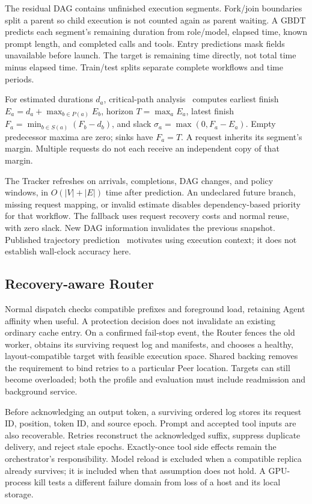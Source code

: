 The residual DAG contains unfinished execution segments. Fork/join
boundaries split a parent so child execution is not counted again as
parent waiting. A GBDT predicts each segment's remaining duration from
role/model, elapsed time, known prompt length, and completed calls and
tools. Entry predictions mask fields unavailable before launch.
The target is remaining time directly, not total time minus elapsed time.
Train/test splits separate complete workflows and time periods.

For estimated durations $d_a$, critical-path analysis~\cite{kelley1959cpm}
computes earliest finish $E_a=d_a+\max_{b\in P(a)}E_b$, horizon
$T=\max_a E_a$, latest finish $F_a=\min_{b\in S(a)}(F_b-d_b)$, and
slack $\sigma_a=\max(0,F_a-E_a)$. Empty predecessor maxima are zero;
sinks have $F_a=T$. A request inherits its segment's margin. Multiple
requests do not each receive an independent copy of that margin.

The Tracker refreshes on arrivals, completions, DAG changes, and policy
windows, in $O(|V|+|E|)$ time after prediction. An undeclared future branch,
missing request mapping, or invalid estimate disables dependency-based
priority for that workflow. The fallback uses request recovery costs and
normal reuse, with zero slack. New DAG information invalidates the previous
snapshot. Published trajectory prediction~\cite{zhang2026heddle} motivates
using execution context; it does not establish wall-clock accuracy here.

\subsection{Recovery-aware Router}
\label{sec:recovery-router}

Normal dispatch checks compatible prefixes and foreground load, retaining
Agent affinity when useful. A protection decision does not invalidate an
existing ordinary cache entry. On a confirmed fail-stop event, the Router
fences the old worker, obtains its surviving request log and manifests,
and chooses a healthy, layout-compatible target with feasible execution
space. Shared backing removes the requirement to bind retries to a
particular Peer location. Targets can still become overloaded; both the
profile and evaluation must include readmission and background service.

Before acknowledging an output token, a surviving ordered log stores its
request ID, position, token ID, and source epoch. Prompt and accepted tool
inputs are also recoverable. Retries reconstruct the acknowledged suffix,
suppress duplicate delivery, and reject stale epochs. Exactly-once tool
side effects remain the orchestrator's responsibility. Model reload is
excluded when a compatible replica already survives; it is included when
that assumption does not hold. A GPU-process kill tests a different
failure domain from loss of a host and its local storage.

